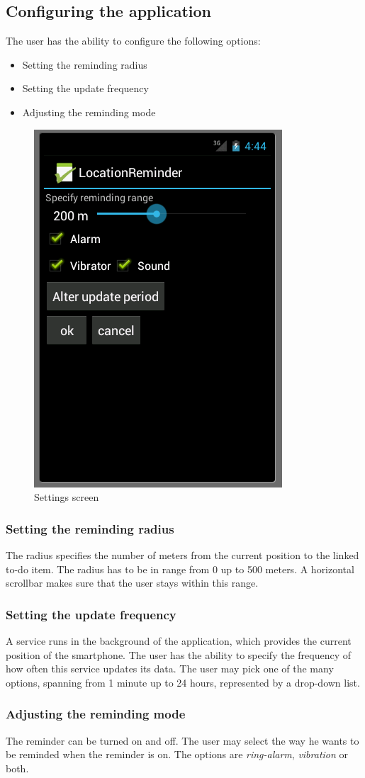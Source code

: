 \subsection{Configuring the application}
The user has the ability to configure the following options:
\begin{itemize}
  \item Setting the reminding radius
  \item Setting the update frequency
  \item Adjusting the reminding mode
\end{itemize}
 \begin{figure}[h]
  \caption{Settings screen}
  \center
  	\includegraphics[scale=0.25]{../resources/preferences-view.png}
\end{figure}

\subsubsection{Setting the reminding radius}
The radius specifies the number of meters from the current position to the
linked to-do item. The radius has to be in range from 0 up to 500 meters. A
horizontal scrollbar makes sure that the user stays within this range.

\subsubsection{Setting the update frequency}
A service runs in the background of the application, which provides the current
position of the smartphone. The user has the ability to specify the frequency of
how often this service updates its data. The user may pick one of the many
options, spanning from 1 minute up to 24 hours, represented by a drop-down list.

\subsubsection{Adjusting the reminding mode}
The reminder can be turned on and off. The user may select the way he wants to
be reminded when the reminder is on. The options are \emph{ring-alarm},
\emph{vibration} or both.
